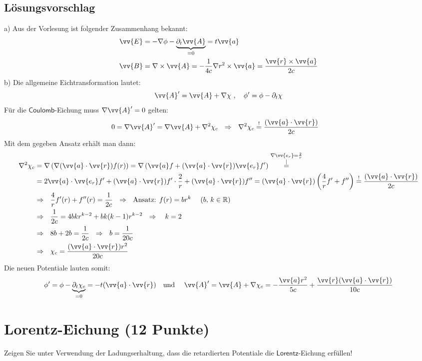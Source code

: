 \documentclass[a4paper,12pt]{article}
\begin{document}
\subsection*{Lösungsvorschlag}
a) Aus der Vorlesung ist folgender Zusammenhang bekannt: 
\begin{align*}
\vv{E}&=-\nabla\phi-\underbrace{\partial_t \vv{A}}_{=0}=t\vv{a}\\
\vv{B}&=\nabla\times\vv{A}=-\frac{1}{4c}\nabla r^2\times \vv{a}=\frac{\vv{r}\times\vv{a}}{2c}
\end{align*}
b) Die allgemeine Eichtransformation lautet:
$$\vv{A}'=\vv{A}+\nabla\chi\ ,\ \ \ \phi '=\phi -\partial_t \chi$$
Für die $\mathsf{Coulomb}$-Eichung muss $\nabla\vv{A}'=0$ gelten:
\begin{align*}
0&=\nabla\vv{A}'=\nabla\vv{A}+\nabla^2\chi_c\ \ \Rightarrow\ \ \nabla^2\chi_c\overset{!}{=}\frac{(\vv{a}\cdot\vv{r})}{2c}
\end{align*}
Mit dem gegeben Ansatz erhält man dann:
\begin{align*}
\nabla^2\chi_c&=\nabla\left(\nabla (\vv{a}\cdot\vv{r})f(r)\right)=\nabla\left(\vv{a}f+(\vv{a}\cdot\vv{r})\vv{e_r}f'\right)\overset{\substack{\nabla\vv{e_r}=\frac{2}{r}\\|}}{=}\\
&=2\vv{a}\cdot\vv{e_r}f'+(\vv{a}\cdot\vv{r})f'\cdot\frac{2}{r}+(\vv{a}\cdot\vv{r})f''=(\vv{a}\cdot\vv{r})\left(\frac{4}{r}f'+f''\right)\overset{!}{=}\frac{(\vv{a}\cdot\vv{r})}{2c}\\
&\Rightarrow\ \ \frac{4}{r}f'(r)+f''(r)=\frac{1}{2c} \ \ \Rightarrow\ \ \textrm{Ansatz: }f(r)=br^k\ \ \ \ (b,\, k\in\mathbb{R})\\
&\Rightarrow\ \ \frac{1}{2c}=4bkr^{k-2}+bk(k-1)r^{k-2}\ \ \Rightarrow\ \ \ k=2\\
&\Rightarrow\ \ 8b+2b=\frac{1}{2c}\ \ \Rightarrow\ \ b=\frac{1}{20c}\\
&\Rightarrow\ \ \chi_c=\frac{(\vv{a}\cdot\vv{r})r^2}{20c}
\end{align*}
Die neuen Potentiale lauten somit:
$$\phi'=\phi-\underbrace{\partial_t\chi_c}_{=0}=-t(\vv{a}\cdot\vv{r})\ \ \ \textrm{und } \ \ \ \vv{A}'=\vv{A}+\nabla\chi_c=-\frac{\vv{a}r^2}{5c}+\frac{\vv{r}(\vv{a}\cdot\vv{r})}{10c}$$
\section{Lorentz-Eichung (12 Punkte)}
Zeigen Sie unter Verwendung der Ladungserhaltung, dass die retardierten Potentiale die $\mathsf{Lorentz}$-Eichung erfüllen!
\end{document}
